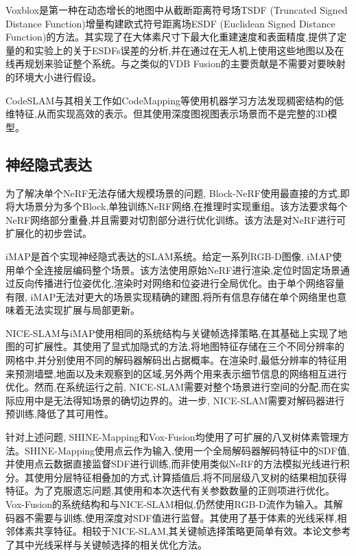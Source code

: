 Voxblox\cite{voxblox}是第一种在动态增长的地图中从截断距离符号场TSDF (Truncated Signed Distance Function)增量构建欧式符号距离场ESDF (Euclidean Signed Distance Function)的方法。其实现了在大体素尺寸下最大化重建速度和表面精度,提供了定量的和实验上的关于ESDFs误差的分析,并在通过在无人机上使用这些地图以及在线再规划来验证整个系统。与之类似的VDB Fusion\cite{vdbfusion}的主要贡献是不需要对要映射的环境大小进行假设。

CodeSLAM\cite{CodeSLAM}与其相关工作如CodeMapping\cite{codemapping}等使用机器学习方法发现稠密结构的低维特征,从而实现高效的表示。但其使用深度图视图表示场景而不是完整的3D模型。
\subsection{神经隐式表达}
为了解决单个NeRF无法存储大规模场景的问题, Block-NeRF\cite{block}使用最直接的方式,即将大场景分为多个Block,单独训练NeRF网络,在推理时实现重组。该方法要求每个NeRF网络部分重叠,并且需要对切割部分进行优化训练。该方法是对NeRF进行可扩展化的初步尝试。

iMAP\cite{imap}是首个实现神经隐式表达的SLAM系统。给定一系列RGB-D图像, iMAP使用单个全连接层编码整个场景。该方法使用原始NeRF进行渲染,定位时固定场景通过反向传播进行位姿优化,渲染时对网络和位姿进行全局优化。由于单个网络容量有限, iMAP无法对更大的场景实现精确的建图,将所有信息存储在单个网络里也意味着无法实现扩展与局部更新。 

NICE-SLAM\cite{nice}与iMAP使用相同的系统结构与关键帧选择策略,在其基础上实现了地图的可扩展性。其使用了显式加隐式的方法,将地图特征存储在三个不同分辨率的网格中,并分别使用不同的解码器解码出占据概率。在渲染时,最低分辨率的特征用来预测墙壁,地面以及未观察到的区域,另外两个用来表示细节信息的网络相互进行优化。然而,在系统运行之前, NICE-SLAM需要对整个场景进行空间的分配,而在实际应用中是无法得知场景的确切边界的。进一步, NICE-SLAM需要对解码器进行预训练,降低了其可用性。

针对上述问题, SHINE-Mapping\cite{shine}和Vox-Fusion\cite{vox}均使用了可扩展的八叉树体素管理方法。SHINE-Mapping使用点云作为输入,使用一个全局解码器解码特征中的SDF值,并使用点云数据直接监督SDF进行训练,而非使用类似NeRF的方法模拟光线进行积分。其使用分层特征相叠加的方式,计算插值后,将不同层级八叉树的结果相加获得特征。为了克服遗忘问题,其使用和本次迭代有关参数数量的正则项进行优化。Vox-Fusion的系统结构和与NICE-SLAM相似,仍然使用RGB-D流作为输入。其解码器不需要与训练,使用深度对SDF值进行监督。其使用了基于体素的光线采样,相邻体素共享特征。相较于NICE-SLAM,其关键帧选择策略更简单有效。本论文参考了其中光线采样与关键帧选择的相关优化方法。

